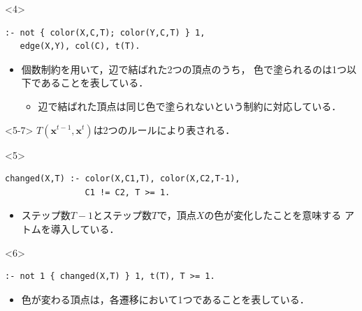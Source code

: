 \documentclass[dvipdfmx,11pt]{beamer}
\begin{document}
\begin{frame}[fragile]
  \begin{onlyenv}<4>
    \begin{exampleblock}{}
      \begin{lstlisting}
:- not { color(X,C,T); color(Y,C,T) } 1, 
   edge(X,Y), col(C), t(T).
      \end{lstlisting}
    \end{exampleblock}
    \begin{itemize}
      \item 個数制約を用いて，辺で結ばれた2つの頂点のうち，
            色で塗られるのは1つ以下であることを表している．
            \begin{itemize}
              \item 辺で結ばれた頂点は同じ色で塗られないという制約に対応している．
            \end{itemize}
    \end{itemize}
  \end{onlyenv}

  \begin{onlyenv}<5-7>
    $T(\bm{x}^{t-1},\bm{x}^{t})$は2つのルールにより表される．
  \end{onlyenv}

  \begin{onlyenv}<5>
    \begin{exampleblock}{}
      \begin{lstlisting}
changed(X,T) :- color(X,C1,T), color(X,C2,T-1),
                C1 != C2, T >= 1.
      \end{lstlisting}
    \end{exampleblock}
    \begin{itemize}
      \item ステップ数$T-1$とステップ数$T$で，頂点$X$の色が変化したことを意味する
            アトムを導入している．
    \end{itemize}
  \end{onlyenv}

  \begin{onlyenv}<6>
  \begin{exampleblock}{}
    \begin{lstlisting}
:- not 1 { changed(X,T) } 1, t(T), T >= 1.
    \end{lstlisting}
  \end{exampleblock}
  \begin{itemize}
    \item 色が変わる頂点は，各遷移において1つであることを表している．
  \end{itemize}
  \end{onlyenv}


\end{frame}
\end{document}
